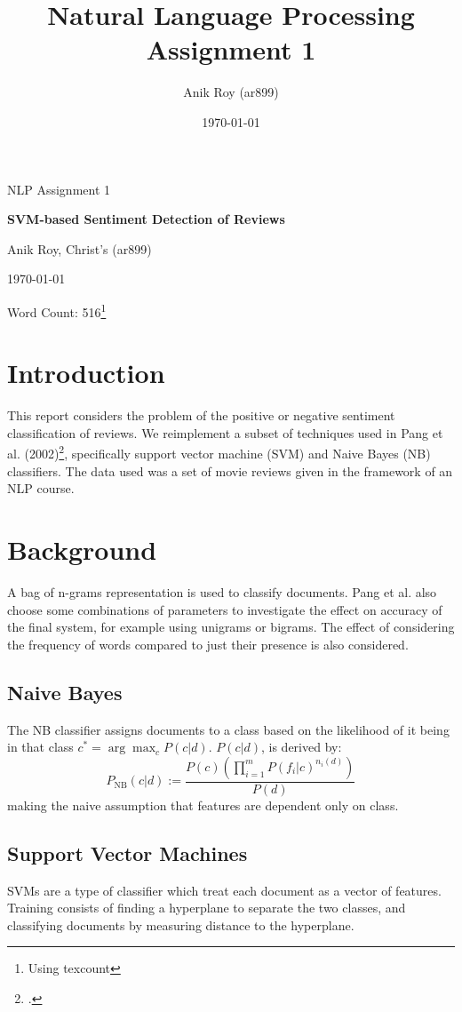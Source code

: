 \documentclass[12pt,a4paper]{article}
\title{
  Natural Language Processing \\
  \large Assignment 1}
\author{Anik Roy (ar899)}
\date{\today}
\begin{document}
\centerline{\large NLP Assignment 1}
\vspace{0.2in}
\centerline{\Large\bf SVM-based Sentiment Detection of Reviews}
\vspace{0.2in}
\centerline{\large {Anik Roy, Christ's (ar899)}}
\vspace{0.2in}
\centerline{\large {\today}}
\vspace{0.1in}
\centerline{Word Count: 516\footnote{Using texcount}}
\vspace{0.2in}


\begin{multicols}{2}
  
\section{Introduction}

This report considers the problem of the positive or negative sentiment classification of reviews. We reimplement a subset of techniques used in Pang et al. (2002)\footcite{pang2002thumbs}, specifically support vector machine (SVM) and Naive Bayes (NB) classifiers. The data used was a set of movie reviews given in the framework of an NLP course.

\section{Background}

A bag of n-grams representation is used to classify documents. Pang et al. also choose some combinations of parameters to investigate the effect on accuracy of the final system, for example using unigrams or bigrams. The effect of considering the frequency of words compared to just their presence is also considered.

\subsection{Naive Bayes}
The NB classifier assigns documents to a class based on the likelihood of it being in that class $c^{*} = \arg \max_{c}P(c | d)$. $P(c | d)$, is derived by:
\[P_\mathrm{NB}(c | d) := \frac{P(c)(\prod^{m}_{i=1}P(f_{i} | c)^{n_{i}(d)})}{P(d)} \]
making the naive assumption that features are dependent only on class.

\subsection{Support Vector Machines}
SVMs are a type of classifier which treat each document as a vector of features. Training consists of finding a hyperplane to separate the two classes, and classifying documents by measuring distance to the hyperplane.


\end{multicols}
\end{document}
